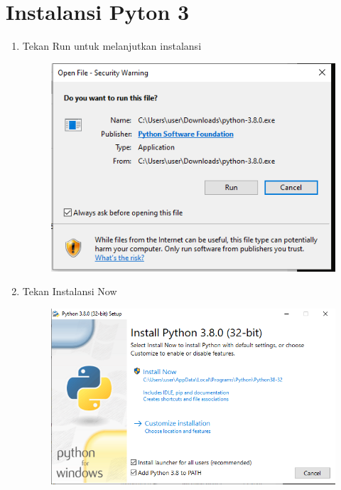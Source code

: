 \section{Instalansi Pyton 3}
\begin{enumerate}
    \item Tekan Run untuk melanjutkan instalansi

\begin{figure}[!htbp]
    \centering
    \includegraphics[scale=0.5]{figures/1.png}
    \label{visimisi}
\end{figure}

    \item Tekan Instalansi Now
    \begin{figure}[!htbp]
    \centering
    \includegraphics[scale=0.5]{figures/2.png}
    \label{visimisi}
\end{figure}



\end{enumerate}
